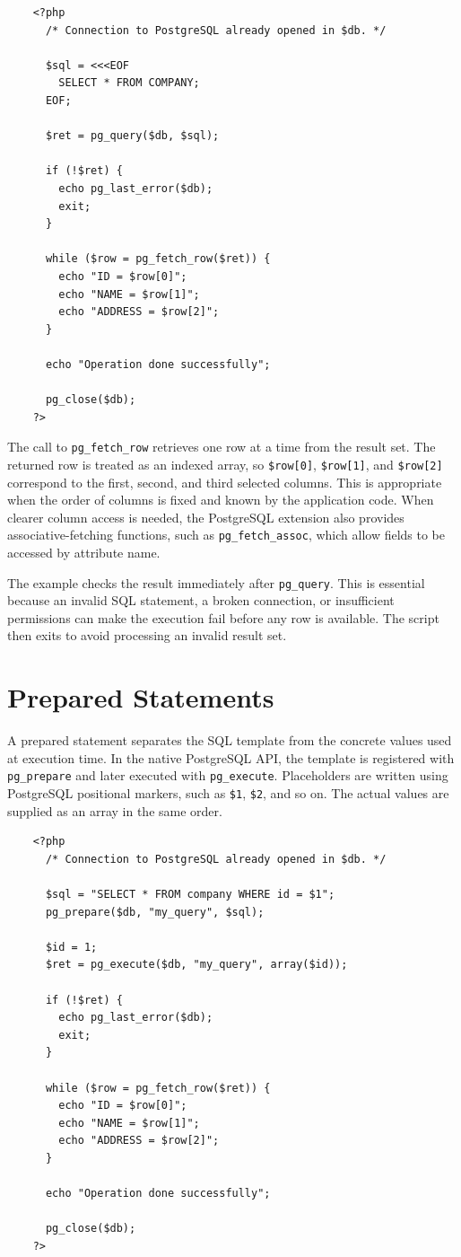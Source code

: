 \documentclass{scrbook}
\begin{document}
	\begin{lstlisting}
	<?php
	  /* Connection to PostgreSQL already opened in $db. */
	
	  $sql = <<<EOF
		SELECT * FROM COMPANY;
	  EOF;
		
	  $ret = pg_query($db, $sql);
	
	  if (!$ret) {
		echo pg_last_error($db);
		exit;
	  }
		
	  while ($row = pg_fetch_row($ret)) {
		echo "ID = $row[0]";
		echo "NAME = $row[1]";
		echo "ADDRESS = $row[2]";
	  }
		
	  echo "Operation done successfully";
		
	  pg_close($db);
	?>
	\end{lstlisting}
	
	The call to \texttt{pg\_fetch\_row} retrieves one row at a time from the result set. The returned row is treated as an indexed array, so \texttt{\$row[0]}, \texttt{\$row[1]}, and \texttt{\$row[2]} correspond to the first, second, and third selected columns. This is appropriate when the order of columns is fixed and known by the application code. When clearer column access is needed, the PostgreSQL extension also provides associative-fetching functions, such as \texttt{pg\_fetch\_assoc}, which allow fields to be accessed by attribute name.
	
	The example checks the result immediately after \texttt{pg\_query}. This is essential because an invalid SQL statement, a broken connection, or insufficient permissions can make the execution fail before any row is available. The script then exits to avoid processing an invalid result set.
	
	\section{Prepared Statements}
	
	A prepared statement separates the SQL template from the concrete values used at execution time. In the native PostgreSQL API, the template is registered with \texttt{pg\_prepare} and later executed with \texttt{pg\_execute}. Placeholders are written using PostgreSQL positional markers, such as \texttt{\$1}, \texttt{\$2}, and so on. The actual values are supplied as an array in the same order.
	
	\begin{lstlisting}
	<?php
	  /* Connection to PostgreSQL already opened in $db. */
		
	  $sql = "SELECT * FROM company WHERE id = $1";
	  pg_prepare($db, "my_query", $sql);
	
	  $id = 1;
	  $ret = pg_execute($db, "my_query", array($id));
	
	  if (!$ret) {
		echo pg_last_error($db);
		exit;
	  }
	
	  while ($row = pg_fetch_row($ret)) {
		echo "ID = $row[0]";
		echo "NAME = $row[1]";
		echo "ADDRESS = $row[2]";
	  }
	
	  echo "Operation done successfully";
	
	  pg_close($db);
	?>
	\end{lstlisting}
	
\end{document}

